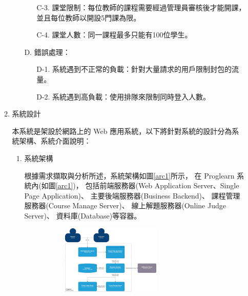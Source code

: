 \documentclass[12pt]{article}
\begin{document}
\begin{enumerate}
\begin{enumerate}
\begin{enumerate}[itemindent=12pt]
\begin{enumerate}[itemindent=24pt]
              \item [C-3.] 課堂限制：每位教師的課程需要經過管理員審核後才能開課，並且每位教師以開設5門課為限。
              \item [C-4.] 課堂人數：同一課程最多只能有100位學生。
            \end{enumerate}      
          \item [D.]錯誤處理：
            \begin{enumerate}[itemindent=24pt]
              \item [D-1.] 系統遇到不正常的負載：針對大量請求的用戶限制封包的流量。
              \item [D-2.] 系統遇到高負載：使用排隊來限制同時登入人數。
            \end{enumerate}
        \end{enumerate}
      \item 系統設計
      \par 本系統是架設於網路上的 Web 應用系統，以下將針對系統的設計分為系統架構、系統介面說明：
        \begin{enumerate}[label=(\arabic*)]
        \setlength{\parindent}{2em}
          \item 系統架構
          \par 根據需求擷取與分析所述，系統架構如圖\ref{arc1}所示，
          在 Proglearn 系統內(如圖\ref{arc1})，
          包括前端服務器(Web Application Server、Single Page Application)、
          主要後端服務器(Business Backend)、
          課程管理服務器(Course Manage Server)、
          線上解題服務器(Online Judge Server)、
          資料庫(Database)等容器。
          \begin{figure}[htb]
            \centering
            \begin{subfigure}{0.45\linewidth}
              \centering
              \href{https://raw.githubusercontent.com/programingtw/proglearn-plan/main/img/arc1.jpg}{
                \includegraphics[width=0.65\textwidth]{./img/arc1.jpg}
}
\end{subfigure}
\end{figure}
\end{enumerate}
\end{enumerate}
\end{enumerate}
\end{document}
